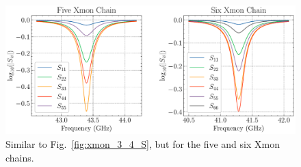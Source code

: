 \begin{figure}[!ht]
    \centering
    \includegraphics[width=\textwidth]{figures/xmon_chain_S_5_6.pdf}
    \caption{Similar to Fig.\ \ref{fig:xmon_3_4_S}, but for the five and six Xmon chains.}
    \label{fig:xmon_5_6_S}
\end{figure}
